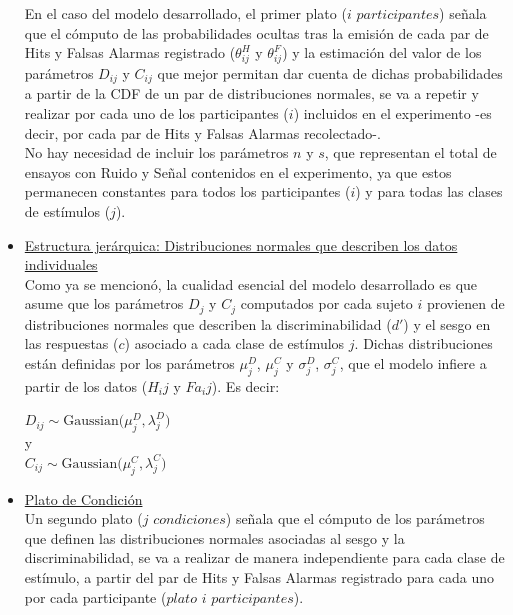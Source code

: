 \begin{itemize}
En el caso del modelo desarrollado, el primer plato ($i$ $participantes$) señala que el cómputo de las probabilidades ocultas tras la emisión de cada par de Hits y Falsas Alarmas registrado ($\theta^H_{ij}$ y $\theta^F_{ij}$) y la estimación del valor de los parámetros $D_{ij}$ y $C_{ij}$ que mejor permitan dar cuenta de dichas probabilidades a partir de la CDF de un par de distribuciones normales, se va a repetir y realizar por cada uno de los participantes ($i$) incluidos en el experimento -es decir, por cada par de Hits y Falsas Alarmas recolectado-.\\

No hay necesidad de incluir los parámetros $n$ y $s$, que representan el total de ensayos con Ruido y Señal contenidos en el experimento, ya que estos permanecen constantes para todos los participantes ($i$) y para todas las clases de estímulos ($j$).\\

\item \underline{Estructura jerárquica: Distribuciones normales que describen los datos individuales}\\

Como ya se mencionó, la cualidad esencial del modelo desarrollado es que asume que los parámetros $D_{j}$ y $C_{j}$ computados por cada sujeto $i$ provienen de distribuciones normales que describen la discriminabilidad ($d'$) y el sesgo en las respuestas ($c$) asociado a cada clase de estímulos $j$. Dichas distribuciones están definidas por los parámetros $\mu^D_{j}$, $\mu^C_{j}$ y $\sigma^D_{j}$, $\sigma^C_{j}$, que el modelo infiere a partir de los datos ($H_ij$ y $Fa_ij$). Es decir:\\

\begin{center}
$D_{ij}\sim \mathrm{Gaussian}\bigl(\mu^D_{j},\lambda^D_{j})$\\
y\\
$C_{ij}\sim \mathrm{Gaussian}\bigl(\mu^C_{j},\lambda^C_{j})$\\
\end{center}

\item \underline{Plato de Condición}\\

Un segundo plato ($j$ $condiciones$) señala que el cómputo de los parámetros que definen las distribuciones normales asociadas al sesgo y la discriminabilidad, se va a realizar de manera independiente para cada clase de estímulo, a partir del par de Hits y Falsas Alarmas registrado para cada uno por cada participante ($plato$ $i$ $participantes$).\\


\end{itemize}
